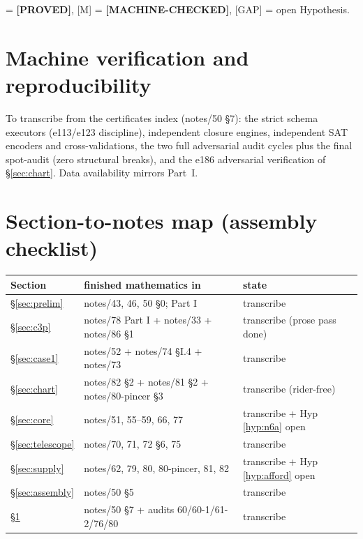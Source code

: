 \documentclass[11pt]{article}
\theoremstyle{definition}
\newcommand{\status}[1]{\textbf{[#1]}}
\begin{document}
\noindent [P] = \status{PROVED}, [M] = \status{MACHINE-CHECKED},
[GAP] = open Hypothesis.

\section{Machine verification and reproducibility}\label{sec:machine}

To transcribe from the certificates index (notes/50 \S7): the strict schema
executors (e113/e123 discipline), independent closure engines, independent
SAT encoders and cross-validations, the two full adversarial audit cycles
plus the final spot-audit (zero structural breaks), and the e186
adversarial verification of \S\ref{sec:chart}.  Data availability mirrors
Part~I.

\section*{Section-to-notes map (assembly checklist)}

\begin{center}
\begin{tabular}{l l l}
\hline
Section & finished mathematics in & state \\
\hline
\S\ref{sec:prelim}  & notes/43, 46, 50 \S0; Part I & transcribe \\
\S\ref{sec:c3p}     & notes/78 Part I + notes/33 + notes/86 \S1 & transcribe (prose pass done) \\
\S\ref{sec:case1}   & notes/52 + notes/74 \S I.4 + notes/73 & transcribe \\
\S\ref{sec:chart}   & notes/82 \S2 + notes/81 \S2 + notes/80-pincer \S3 & transcribe (rider-free) \\
\S\ref{sec:core}    & notes/51, 55--59, 66, 77 & transcribe + Hyp \ref{hyp:n6a} open \\
\S\ref{sec:telescope} & notes/70, 71, 72 \S6, 75 & transcribe \\
\S\ref{sec:supply}  & notes/62, 79, 80, 80-pincer, 81, 82 & transcribe + Hyp \ref{hyp:afford} open \\
\S\ref{sec:assembly} & notes/50 \S5 & transcribe \\
\S\ref{sec:machine} & notes/50 \S7 + audits 60/60-1/61-2/76/80 & transcribe \\
\hline
\end{tabular}
\end{center}
\end{document}
